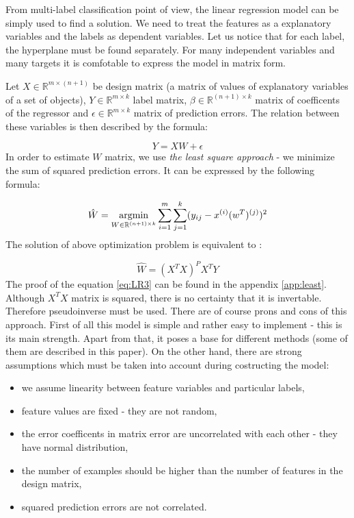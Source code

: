 From multi-label classification point of view, the linear regression model can be simply used to find a solution. We need to treat the features as a explanatory variables and the labels as dependent variables. Let us notice that for each label, the hyperplane must be found separately. For many independent variables and many targets it is comfotable to express the model in matrix form.  

Let $X \in \mathbb{R}^{m \times  ( n+1 )}$ be design matrix (a matrix of values of explanatory variables of a set of objects), $Y \in \mathbb{R}^{m \times k}$ label matrix, $\beta \in \mathbb{R}^{(n+1) \times k}$ matrix of coefficents of the regressor and $\epsilon \in \mathbb{R}^{m \times k}$ matrix of prediction errors. The relation between these variables is then described by the formula:

\begin{equation}\label{eq:LR1}
    Y = XW + \epsilon 
\end{equation}
In order to estimate $W$ matrix, we use \textit{the least square approach} - we minimize the sum of squared prediction errors. It can be expressed by the following formula:

\begin{equation}\label{eq:LR2}
    \hat{W} = \operatorname*{argmin}_{W \in \mathbb{R}^{(n+1) \times k}}\sum\limits_{i=1}^{m}\sum\limits_{j=1}^{k}(y_{ij}-x^{(i)}(w^T)^{(j)})^2
\end{equation}
The solution of above optimization problem is equivalent to \cite{Weisberg}:

\begin{equation}\label{eq:LR3}
    \hat{W} = (X^TX)^{P}X^TY
\end{equation}
The proof of the equation \ref{eq:LR3} can be found in the appendix \ref{app:least}. Although $X^TX$ matrix is squared, there is no certainty that it is invertable. Therefore pseudoinverse must be used. There are of course prons and cons of this approach. First of all this model is simple and rather easy to implement - this is its main strength. Apart from that, it poses a base for different methods (some of them are described in this paper). On the other hand, there are strong assumptions which must be taken into account during costructing the model:

\begin{itemize}
    \item we assume linearity between feature variables and particular labels,
    \item feature values are fixed - they are not random,
    \item the error coefficents in matrix error are uncorrelated with each other - they have normal distribution,
    \item the number of examples should be higher than the number of features in the design matrix,
    \item squared prediction errors are not correlated.
\end{itemize}

